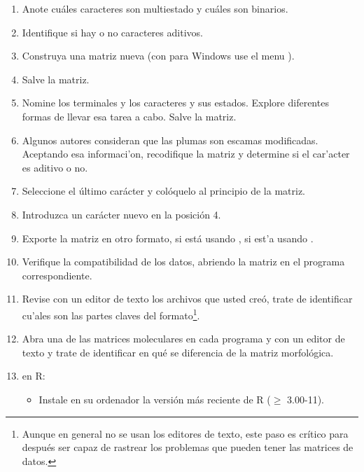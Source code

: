 \begin{enumerate}
	\item Anote cu\'ales caracteres son multiestado y cu\'ales son binarios.

	\item Identifique si hay o no caracteres aditivos.

	\item Construya una matriz nueva (con  para Windows use el menu ). 

	\item Salve la matriz.

	\item Nomine los terminales y los caracteres y sus estados. Explore diferentes formas de llevar esa tarea a cabo. Salve la matriz.

	\item Algunos autores consideran que las plumas son escamas modificadas. Aceptando esa informaci'on, recodifique la matriz y determine si el car'acter es aditivo o no.

	\item Seleccione el \'ultimo car\'acter y col\'oquelo al principio de la matriz. 

	\item Introduzca un car\'acter nuevo en la posici\'on 4.

	\item Exporte la matriz en otro formato,  si est\'a usando ,  si est'a usando .

	\item Verifique la compatibilidad de los datos, abriendo la matriz en el programa correspondiente.

	\item Revise con un editor de texto los archivos que usted cre\'o, trate de identificar cu'ales son las partes claves del formato\footnote{Aunque en general no se usan los editores de texto, este paso es cr\'itico para despu\'es ser capaz de rastrear los problemas que pueden tener las matrices de datos.}.

	\item Abra una de las matrices moleculares en cada programa y con un editor de texto y trate de identificar en qu\'e se diferencia de la matriz morfol\'ogica.

	\item en R:
	\begin{itemize}
		\item Instale en su ordenador la versi\'on m\'as reciente de R ($\ge$ 3.00-11). 


\end{itemize}
\end{enumerate}
